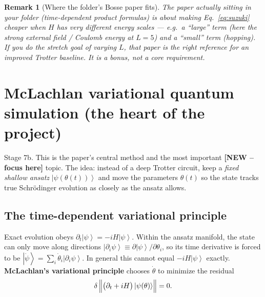 \documentclass[11pt,a4paper]{article}
\newcommand{\ket}[1]{\left|#1\right\rangle}
\newtheorem{remark}{Remark}[section]
\newcommand{\newx}{\textcolor{red!70!black}{\textbf{[NEW -- focus here]}}}
\begin{document}
\begin{remark}[Where the folder's Bosse paper fits]
The paper actually sitting in your folder (time-dependent product formulas) is about making
Eq.~\eqref{eq:suzuki} \emph{cheaper} when $H$ has very different energy scales --- e.g.\ a ``large''
term (here the strong external field / Coulomb energy at $L=5$) and a ``small'' term (hopping). If
you do the stretch goal of varying $L$, that paper is the right reference for an improved Trotter
baseline. It is a bonus, not a core requirement.
\end{remark}

\section{McLachlan variational quantum simulation (the heart of the project)}\label{sec:mclachlan}

\begin{whybox}
Stage 7b. This is the paper's central method and the most important \newx{} topic. The idea: instead
of a deep Trotter circuit, keep a \emph{fixed shallow ansatz} $\ket{\psi(\theta(t))}$ and move the
parameters $\theta(t)$ so the state tracks true Schr\"odinger evolution as closely as the ansatz
allows.
\end{whybox}

\subsection{The time-dependent variational principle}
Exact evolution obeys $\partial_t\ket{\psi}=-iH\ket{\psi}$. Within the ansatz manifold, the state can
only move along directions $\ket{\partial_i\psi}\equiv\partial\ket{\psi}/\partial\theta_i$, so its
time derivative is forced to be $\ket{\dot\psi}=\sum_i \dot\theta_i\ket{\partial_i\psi}$. In general
this cannot equal $-iH\ket{\psi}$ exactly. \textbf{McLachlan's variational principle} chooses
$\dot\theta$ to minimize the residual
\begin{equation}
\delta\,\Bigl\| \bigl(\partial_t + iH\bigr)\ket{\psi(\theta)} \Bigr\| = 0 .
\label{eq:mclachlan}
\end{equation}
\end{document}
